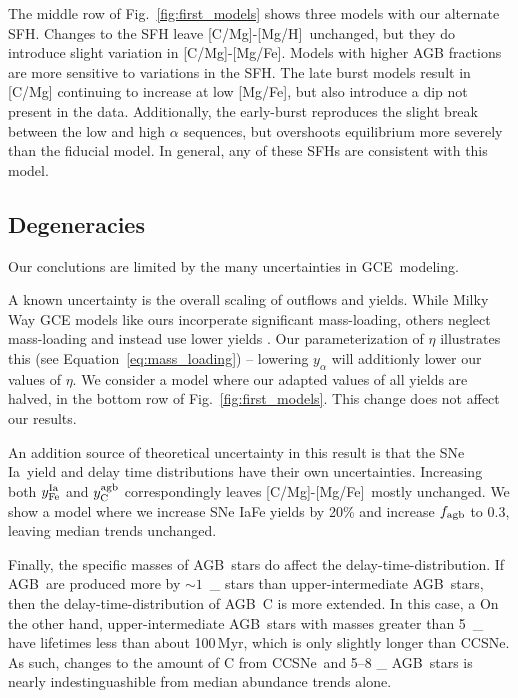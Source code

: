 \documentclass[fleqn,
usenatbib]{mnras}
\newcommand{\agb}{AGB}
\newcommand{\cc}{CCSNe}
\newcommand{\gce}{GCE}
\newcommand{\ia}{SNe Ia}
\newcommand{\sfh}{SFH} %
\newcommand{\caah}{[C/Mg]-[Mg/H]}
\newcommand{\caafe}{[C/Mg]-[Mg/Fe]}
\newcommand{\Ycagb}{\ensuremath{y_{\rm C}^{\rm agb}}}
\newcommand{\Mo}{%
    \ifmmode {\rm M}_{\sun}%
    \else {M$_{\sun}$}%
    \fi}
\newcommand{\about}[1]{${\sim} #1$}
\begin{document}
The middle row of Fig.~\ref{fig:first_models} shows three models with our alternate \sfh{}. Changes to the \sfh{} leave \caah\ unchanged, but they do introduce slight variation in \caafe. Models with higher \agb{} fractions are more sensitive to variations in the \sfh{}. The late burst models result in [C/Mg] continuing to increase at low [Mg/Fe], but also introduce a dip not present in the data. Additionally, the early-burst
reproduces the slight break between the low and high $\alpha$ sequences, but overshoots equilibrium more severely than the fiducial model. 
In general, any of these \sfh{}s are consistent with this model.



\subsection{Degeneracies} \label{sec:outflows}

Our conclutions are limited by the many uncertainties in \gce\ modeling. 

A known uncertainty is the overall scaling of outflows and yields. While Milky Way \gce{} models like ours incorperate significant mass-loading, others
neglect mass-loading and instead use lower yields \citep[e.g.][]{MCM13, MCM14, spitoni19, spitoni20, spitoni21}.
Our parameterization of $\eta$ illustrates this (see Equation~\ref{eq:mass_loading}) -- lowering $y_\alpha$ will additionly lower our values of $\eta$. 
We consider a model where our adapted values of all yields are halved, in the bottom row of Fig.~\ref{fig:first_models}. This change does not affect our results.

An addition source of theoretical uncertainty in this result is that the \ia\ yield and delay time distributions have their own uncertainties. Increasing both $y_{\rm Fe}^{\rm Ia}$ and $\Ycagb$ correspondingly leaves \caafe\ mostly unchanged. We show a model where we increase \ia Fe yields by 20\% and increase $f_{\rm agb}$ to 0.3, leaving median trends unchanged.

Finally, the specific masses of \agb\ stars do affect the delay-time-distribution. If \agb\ are produced more by \about{1}\,\Mo stars than upper-intermediate \agb\ stars, then the delay-time-distribution of \agb\ C is more extended. In this case, a
On the other hand, upper-intermediate \agb\ stars with masses greater than 5\,\Mo have lifetimes less than about 100\,Myr, which is only slightly longer than \cc. As such, changes to the amount of C from \cc\ and 5--8\Mo \agb\ stars is nearly indestinguashible from median abundance trends alone.
\end{document}

